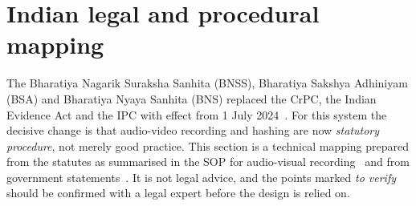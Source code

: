 \section{Indian legal and procedural mapping}
\label{sec:legal}

The Bharatiya Nagarik Suraksha Sanhita (BNSS), Bharatiya Sakshya Adhiniyam (BSA) and Bharatiya Nyaya Sanhita (BNS) replaced the CrPC, the Indian Evidence Act and the IPC with effect from 1 July 2024~\cite{bnss2023,bsa2023,bns2023}. For this system the decisive change is that audio-video recording and hashing are now \emph{statutory procedure}, not merely good practice. This section is a technical mapping prepared from the statutes as summarised in the SOP for audio-visual recording~\cite{sopbnss} and from government statements~\cite{rs1332,pib2026}. It is not legal advice, and the points marked \emph{to verify} should be confirmed with a legal expert before the design is relied on.

